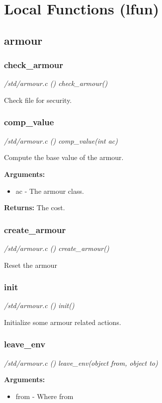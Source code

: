 \section{Local Functions (lfun)}

\subsection{armour}
\subsubsection{check\_armour}

{\em /std/armour.c () check\_armour()}

Check file for security.


\subsubsection{comp\_value}

{\em /std/armour.c () comp\_value(int ac)}

Compute the base value of the armour.

{\bf Arguments:}
\begin{itemize}
\item     ac - The armour class.
\end{itemize}

{\bf Returns:}        The cost.


\subsubsection{create\_armour}

{\em /std/armour.c () create\_armour()}

Reset the armour


\subsubsection{init}

{\em /std/armour.c () init()}

Initialize some armour related actions.


\subsubsection{leave\_env}

{\em /std/armour.c () leave\_env(object from, object to)}


{\bf Arguments:}
\begin{itemize}
\item     from - Where from
\end{itemize}


